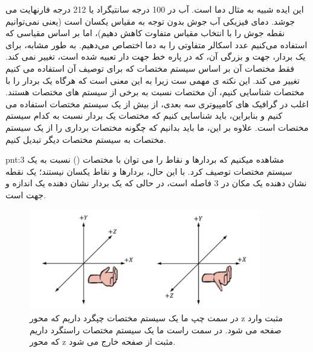 {\begin{spacing}{1.5}
        این ایده شبیه به مثال دما است. آب در 100 درجه سانتیگراد یا 212 درجه فارنهایت می جوشد.
        دمای فیزیکی آب جوش بدون توجه به مقیاس یکسان است (یعنی نمی‌توانیم نقطه جوش را با انتخاب مقیاس متفاوت کاهش دهیم)،
        اما بر اساس مقیاسی که استفاده می‌کنیم عدد اسکالر متفاوتی را به دما اختصاص می‌دهیم.
        به طور مشابه، برای یک بردار، جهت و بزرگی آن، که در پاره خط جهت دار تعبیه شده است، تغییر نمی کند.
        فقط مختصات آن بر اساس سیستم مختصات که برای توصیف آن استفاده می کنیم تغییر می کند.
        این نکته ی مهمی ست زیرا به این معنی است که هرگاه یک بردار را با مختصات شناسایی کنیم، آن مختصات نسبت به برخی از سیستم های مختصات هستند.
        اغلب در گرافیک های کامپیوتری سه بعدی، از بیش از یک سیستم مختصات استفاده می کنیم و بنابراین، باید شناسایی کنیم که مختصات یک بردار نسبت به کدام سیستم مختصات است.
        علاوه بر این، ما باید بدانیم که چگونه مختصات برداری را از یک سیستم مختصات به سیستم مختصات دیگر تبدیل کنیم.
        \textbf{\vspace{-10pt}}
        \begin{point}{pnt:3}
            \Large
            مشاهده میکنیم که بردارها و نقاط را می توان با مختصات () نسبت به یک سیستم مختصات توصیف کرد.
            با این حال، بردارها و نقاط یکسان نیستند؛ یک نقطه نشان دهنده یک مکان در 3 فاصله است، در حالی که یک بردار نشان دهنده یک اندازه و جهت است.
        \end{point}
        \textbf{\vspace{-50pt}}
    \end{spacing}

    \begin{figure}[H]
        \centering
        \setlength{\belowcaptionskip}{-10pt}
        \includegraphics[width=0.9\textwidth]{Images/4/4.Session.1.1.5}
        \caption{در سمت چپ ما یک سیستم مختصات چپگرد داریم که محور z مثبت وارد صفحه می شود. در سمت راست ما یک سیستم مختصات راستگرد داریم که محور z مثبت از صفحه خارج می شود.}
        \label{fig:4.Session.1.1.5}
    \end{figure}
}

